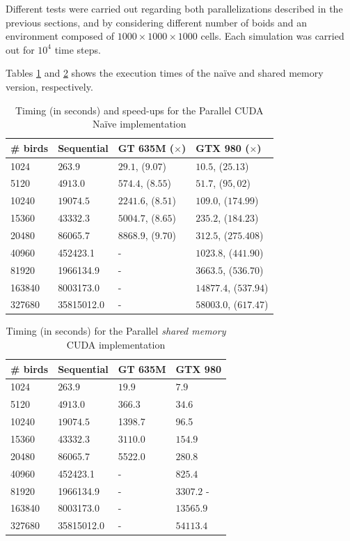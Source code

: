 Different tests were carried out regarding both parallelizations described in the previous sections, and by considering different number of boids and an environment composed of $1000 \times 1000 \times 1000 $ cells. Each simulation was carried out for $10^4$ time steps. 

Tables \ref{tab:naive} and \ref{tab:ifdiv} shows the execution times of the na\"ive and shared memory version, respectively.
\begin{table} [h!]
	\centering
	\begin{tabular}{|l |l |l| l|}
		\hline
		\# birds & Sequential & GT	635M ($\times$) & GTX 980 ($\times$) 
		\\
		\hline
		
		1024  	& \(263.9\) 	& $29.1$, ($9.07$) 	& $10.5$, ($25.13$) \\
		5120  	& \(4913.0\) 	& $574.4$, ($8.55$) 	& $51.7$, ($95,02$)  \\
		10240 	&  $19074.5$ 	& $2241.6$, ($8.51$) 	& $109.0$, ($174.99$)  \\
		15360 	& \(43332.3\) 	& $5004.7$, ($8.65$) 	& $235.2$, ($184.23$)  \\
		20480  	& 86065.7 		& $8868.9$, ($9.70$) 	& $312.5$, ($275.408$) \\
		40960  	& 452423.1 		& - 						& $1023.8$, ($441.90$)  \\
		81920  	& 1966134.9 	& - 						& $3663.5$, ($536.70$)  \\
		163840  & 8003173.0 	& - 						& $14877.4$, ($537.94$)	 \\
		327680  & 35815012.0 	& - 						& $58003.0$, ($617.47$)  \\
		\hline
	\end{tabular}
	\caption{Timing (in seconds) and speed-ups for the Parallel CUDA Na\"ive implementation}
	\label{tab:naive}
\end{table}

\begin{table} [h!]
	\centering
	\begin{tabular}{|l |l |l| l|}
		\hline
		\# birds & Sequential & GT	635M & GTX 980
		\\
		\hline
		1024  & \(263.9\) & $19.9$ & $7.9$  \\
		5120  & \(4913.0\) & $366.3$ & $34.6$  \\
		10240 &  $19074.5$ & 1398.7 & 96.5  \\
		15360  & \(43332.3\) & $3110.0$ & $154.9$  \\
		20480  & 86065.7 & 5522.0 & $280.8$ \\
		40960  & 452423.1 & - & $825.4$ \\
		81920  & 1966134.9 & - & $3307.2$ - \\
		163840  & 8003173.0 & - & $13565.9$ \\
		327680  & 35815012.0 & - & $54113.4$  \\
		\hline
	\end{tabular}
	\caption{Timing (in seconds)  for the Parallel \textit{shared memory} CUDA implementation}
	\label{tab:ifdiv}
\end{table}

